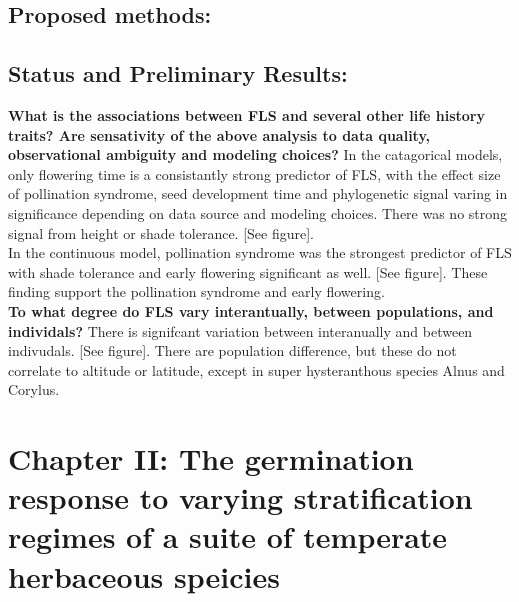 \documentclass{article}\usepackage[]{graphicx}\usepackage[]{color}
\begin{document}

\subsection*{Proposed methods:}
\subsection*{Status and Preliminary Results:}
\textbf{What is the associations between FLS and several other life history traits?  Are sensativity of the above analysis to data quality, observational ambiguity and modeling choices?}
In the catagorical models, only flowering time is a consistantly strong predictor of FLS, with the effect size of pollination syndrome, seed development time and phylogenetic signal varing in significance depending on data source and modeling choices. There was no strong signal from height or shade tolerance. [See figure].\\
In the continuous model, pollination syndrome was the strongest predictor of FLS with shade tolerance and early flowering significant as well. [See figure]. These finding support the pollination syndrome and early flowering.\\
\textbf{To what degree do FLS vary interantually, between populations, and individals?}
There is signifcant variation between interanually and between indivudals. [See figure]. There are population difference, but these do not correlate to altitude or latitude, except in super hysteranthous species Alnus and Corylus.\\


\section*{Chapter II: The germination response to varying stratification regimes of a suite of temperate herbaceous speicies}
\end{document}
